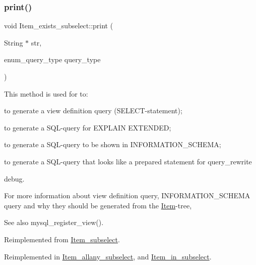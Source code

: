 \subsubsection{\texorpdfstring{print()}{print()}}
{\footnotesize\ttfamily void Item\+\_\+exists\+\_\+subselect\+::print (\begin{DoxyParamCaption}\item[{String $\ast$}]{str,  }\item[{enum\+\_\+query\+\_\+type}]{query\+\_\+type }\end{DoxyParamCaption})\hspace{0.3cm}{\ttfamily [virtual]}}

This method is used for to\+:
\begin{DoxyItemize}
\item to generate a view definition query (S\+E\+L\+E\+CT-\/statement);
\item to generate a S\+QL-\/query for E\+X\+P\+L\+A\+IN E\+X\+T\+E\+N\+D\+ED;
\item to generate a S\+QL-\/query to be shown in I\+N\+F\+O\+R\+M\+A\+T\+I\+O\+N\+\_\+\+S\+C\+H\+E\+MA;
\item to generate a S\+QL-\/query that looks like a prepared statement for query\+\_\+rewrite
\item debug.
\end{DoxyItemize}

For more information about view definition query, I\+N\+F\+O\+R\+M\+A\+T\+I\+O\+N\+\_\+\+S\+C\+H\+E\+MA query and why they should be generated from the \mbox{\hyperlink{classItem}{Item}}-\/tree, \begin{DoxySeeAlso}{See also}
mysql\+\_\+register\+\_\+view(). 
\end{DoxySeeAlso}


Reimplemented from \mbox{\hyperlink{classItem__subselect_a61f70e7dc36e3aad77919971995cccb9}{Item\+\_\+subselect}}.



Reimplemented in \mbox{\hyperlink{classItem__allany__subselect_ade4b2eaa6af0cde005b082598d2e31b0}{Item\+\_\+allany\+\_\+subselect}}, and \mbox{\hyperlink{classItem__in__subselect_a8c80eb807d1c1219807fd45db61fad8f}{Item\+\_\+in\+\_\+subselect}}.

\mbox{\label{classItem__exists__subselect_a2ca1dbb0f70d442c43e5360933a5a44d}} 
